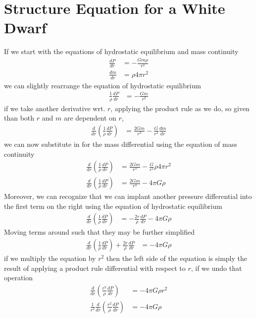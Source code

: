 \section{Structure Equation for a White Dwarf}
If we start with the equations of hydrostatic equilibrium and mass continuity
\begin{align*}
    \frac{dP}{dr} &= -\frac{Gm\rho}{r^{2}}\\
    \frac{dm}{dr} &= \rho4\pi r^{2}
\end{align*}
we can slightly rearrange the equation of hydrostatic equilibrium
\begin{align*}
    \frac{1}{\rho}\frac{dP}{dr} &= -\frac{Gm}{r^{2}}
\end{align*}
if we take another derivative wrt. $r$, applying the product rule as we do, so given than both $r$ and $m$ are dependent on $r$, 
\begin{align*}
    \frac{d}{dr}\left(\frac{1}{\rho}\frac{dP}{dr}\right) &= \frac{2Gm}{r^{3}} - \frac{G}{r^{2}}\frac{dm}{dr} 
\end{align*}
we can now substitute in for the mass differential using the equation of mass continuity
\begin{align*}
    \frac{d}{dr}\left(\frac{1}{\rho}\frac{dP}{dr}\right) &= \frac{2Gm}{r^{3}} - \frac{G}{r^{2}}\rho4\pi r^{2} \\
    \frac{d}{dr}\left(\frac{1}{\rho}\frac{dP}{dr}\right) &= \frac{2Gm}{r^{3}} - 4\pi G\rho
\end{align*}
Moreover, we can recognize that we can implant another pressure differential into the first term on the right using the equation of hydrostatic equilibrium
\begin{align*}
    \frac{d}{dr}\left(\frac{1}{\rho}\frac{dP}{dr}\right) &= -\frac{2r}{\rho}\frac{dP}{dr} - 4\pi G\rho 
\end{align*}
Moving terms around such that they may be further simplified
\begin{align*}
    \frac{d}{dr}\left(\frac{1}{\rho}\frac{dP}{dr}\right) + \frac{2r}{\rho}\frac{dP}{dr} &=  - 4\pi G\rho 
\end{align*}
if we multiply the equation by $r^{2}$ then the left side of the equation is simply the result of applying a product rule differential with respect to $r$, if we undo that operation
\begin{align*}
    \frac{d}{dr}\left(\frac{r^{2}}{\rho}\frac{dP}{dr}\right) &=  - 4\pi G\rho r^{2} \\
    \frac{1}{r^{2}}\frac{d}{dr}\left(\frac{r^{2}}{\rho}\frac{dP}{dr}\right) &=  - 4\pi G\rho
\end{align*}
